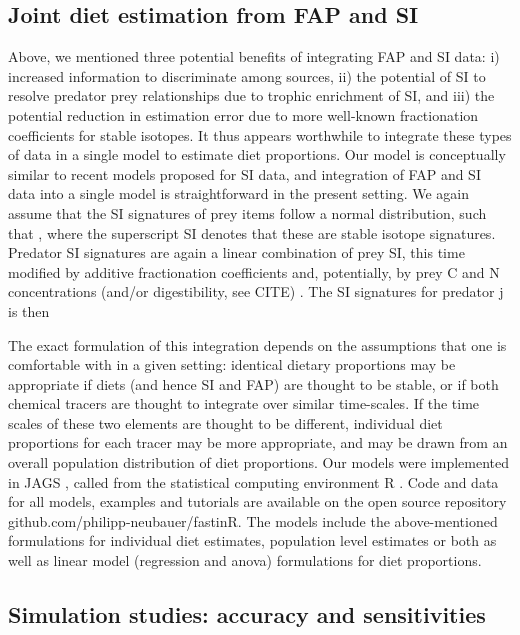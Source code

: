 \documentclass[12pt]{article}%
\begin{document}
\begin{spacing}{1.9}
\begin{flushleft}
\subsection{Joint diet estimation from FAP and SI}
Above, we mentioned three potential benefits of integrating FAP and SI
data: i) increased information to discriminate among sources, ii) the
potential of SI to resolve predator prey relationships due to trophic
enrichment of SI, and iii) the potential reduction in estimation error
due to more well-known fractionation coefficients for stable
isotopes. It thus appears worthwhile to integrate these types of data
in a single model to estimate diet proportions. Our model is
conceptually similar to recent models proposed for SI data, and
integration of FAP and SI data into a single model is straightforward
in the present setting. We again assume that the SI signatures of prey
items follow a normal distribution, such that , where the superscript
SI denotes that these are stable isotope signatures. Predator SI
signatures are again a linear combination of prey SI, this time
modified by additive fractionation coefficients and, potentially, by
prey C and N concentrations (and/or digestibility, see CITE) . The SI
signatures for predator j is then

The exact formulation of this integration depends on the assumptions that one is comfortable with in a given setting: identical dietary proportions may be appropriate if diets (and hence SI and FAP) are thought to be stable, or if both chemical tracers are thought to integrate over similar time-scales. If the time scales of these two elements are thought to be different, individual diet proportions for each tracer may be more appropriate, and may be drawn from an overall population distribution of diet proportions.
Our models were implemented in JAGS \citep{plummer_jags_2003}, called
from the statistical computing environment R \citep{R_core_2014}. Code
and data for all models, examples and tutorials are available on the
open source repository github.com/philipp-neubauer/fastinR. The models
include the above-mentioned formulations for individual diet
estimates, population level estimates or both as well as linear model
(regression and anova) formulations for diet proportions. 




\subsection{Simulation studies: accuracy and sensitivities}


\end{flushleft}
\end{spacing}
\end{document}
